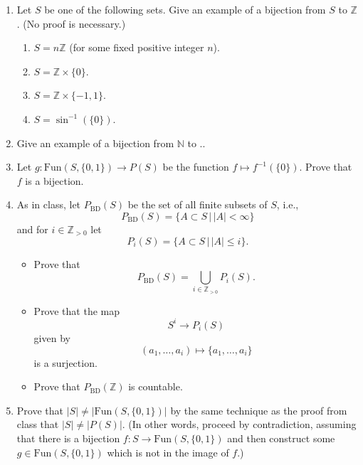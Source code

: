 \begin{enumerate}
\item Let $S$ be one of the following sets. Give an example of a bijection from $S$ to $\mathbb{Z}$. (No proof is necessary.)
  \begin{enumerate}
  \item $S = n\mathbb{Z}$ (for some fixed positive integer $n$).
  \item $S = \mathbb{Z} \times \{0\}$.    
  \item $S = \mathbb{Z} \times \{-1,1\}$.
  \item $S = \sin^{-1}(\{0\})$.
  \end{enumerate}

\item Give an example of a bijection from $\mathbb{N}$ to ..
  
\item  Let $g\colon \text{Fun}(S, \{0,1\})  \to P(S)$ be the function $f
\mapsto f^{-1}(\{0\})$. Prove that $f$ is a bijection.\\

\item  As in class, let $P_{\text{BD}}(S)$ be the set of all finite
subsets of $S$, i.e., 
\[
P_{\text{BD}}(S) = \{ A \subset S \,|\, |A| < \infty \}
\]
and for $i \in \mathbb{Z}_{ >  0}$ let 
\[
P_{i}(S) = \{ A \subset S \,|\, |A| \leq i \}.
\]
\begin{itemize}
\item [(a)] Prove that
\[
P_{\text{BD}}(S) = \bigcup_{i \in \mathbb{Z}_{> 0}} P_i(S).
\]
\item [(b)] Prove that the map
\[
 S^i \to P_i(S) 
\]
given by 
\[
(a_1, \ldots, a_i) \mapsto \{a_1,\ldots,a_i\}
\]
is a surjection.
\item [(c)] Prove that $P_{\text{BD}}(\mathbb{Z})$ is countable.\\
\end{itemize}

\item  Prove that $|S| \neq |\text{Fun}(S, \{0,1\})|$ by the same
technique as the proof from class that $|S| \neq |P(S)|$. (In other
words, proceed by contradiction, assuming that there is a bijection
$f\colon S \to \text{Fun}(S, \{0,1\})$ and then construct some $g \in
\text{Fun}(S, \{0,1\})$ which is not in the image of $f$.)
\end{enumerate}



